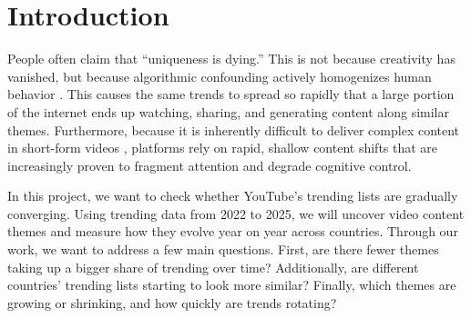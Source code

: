 \documentclass[sigconf,11pt]{acmart}
\begin{document}

\maketitle
\pagestyle{plain} 

\section{Introduction}
People often claim that “uniqueness is dying.” This is not because creativity has vanished, but because algorithmic confounding actively homogenizes human behavior \cite{Chaney_2018}. This causes the same trends to spread so rapidly that a large portion of the internet ends up watching, sharing, and generating content along similar themes. Furthermore, because it is inherently difficult to deliver complex content in short-form videos \cite{10457053}, platforms rely on rapid, shallow content shifts that are increasingly proven to fragment attention and degrade cognitive control.

In this project, we want to check whether YouTube’s trending lists are gradually converging. Using trending data from 2022 to 2025, we will uncover video content themes and measure how they evolve year on year across countries. Through our work, we want to address a few main questions. First, are there fewer themes taking up a bigger share of trending over time? Additionally, are different countries’ trending lists starting to look more similar? Finally, which themes are growing or shrinking, and how quickly are trends rotating?



\end{document}
